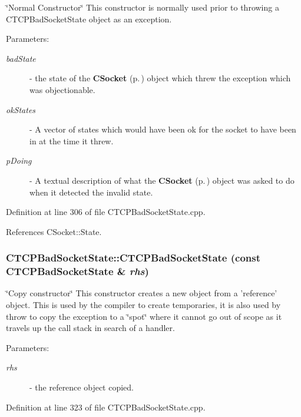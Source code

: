 \char`\"{}Normal Constructor\char`\"{} This constructor is normally used prior to throwing a CTCPBad\-Socket\-State object as an exception.\begin{Desc}
\item[Parameters: ]\par
\begin{description}
\item[{\em 
bad\-State}]- the state of the {\bf CSocket} {\rm (p.\,\pageref{classCSocket})} object which threw the exception which was objectionable. \item[{\em 
ok\-States}]- A vector of states which would have been ok for the socket to have been in at the time it threw. \item[{\em 
p\-Doing}]- A textual description of what the {\bf CSocket} {\rm (p.\,\pageref{classCSocket})} object was asked to do when it detected the invalid state. \end{description}
\end{Desc}


Definition at line 306 of file CTCPBad\-Socket\-State.cpp.

References CSocket::State.
\subsubsection{\setlength{\rightskip}{0pt plus 5cm}CTCPBad\-Socket\-State::CTCPBad\-Socket\-State (const CTCPBad\-Socket\-State \& {\em rhs})}\label{classCTCPBadSocketState_a1}


\char`\"{}Copy constructor\char`\"{} This constructor creates a new object from a 'reference' object. This is used by the compiler to create temporaries, it is also used by throw to copy the exception to a \char`\"{}spot\char`\"{} where it cannot go out of scope as it travels up the call stack in search of a handler.\begin{Desc}
\item[Parameters: ]\par
\begin{description}
\item[{\em 
rhs}]- the reference object copied. \end{description}
\end{Desc}


Definition at line 323 of file CTCPBad\-Socket\-State.cpp.
